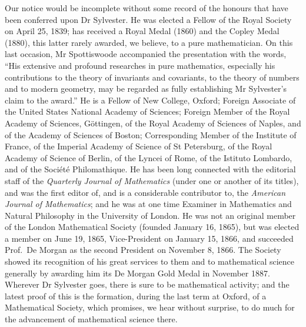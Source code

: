 \documentclass[11pt,a4paper]{article}
\begin{document}
Our notice would be incomplete without some record of the honours that have been conferred upon Dr Sylvester. He was elected a Fellow of the Royal Society on April 25, 1839; has received a Royal Medal (1860) and the Copley Medal (1880), this latter rarely awarded, we believe, to a pure mathematician. On this last occasion, Mr Spottiswoode accompanied the presentation with the words, ``His extensive and profound researches in pure mathematics, especially his contributions to the theory of invariants and covariants, to the theory of numbers and to modern geometry, may be regarded as fully establishing Mr Sylvester's claim to the award.'' He is a Fellow of New College, Oxford; Foreign Associate of the United States National Academy of Sciences; Foreign Member of the Royal Academy of Sciences, G\"ottingen, of the Royal Academy of Sciences of Naples, and of the Academy of Sciences of Boston; Corresponding Member of the Institute of France, of the Imperial Academy of Science of St Petersburg, of the Royal Academy of Science of Berlin, of the Lyncei of Rome, of the Istituto Lombardo, and of the Soci\'et\'e Philomathique. He has been long connected with the editorial staff of the \emph{Quarterly Journal of Mathematics} (under one or another of its titles), and was the first editor of, and is a considerable contributor to, the \emph{American Journal of Mathematics}; and he was at one time Examiner in Mathematics and Natural Philosophy in the University of London. He was not an original member of the London Mathematical Society (founded January 16, 1865), but was elected a member on June 19, 1865, Vice-President on January 15, 1866, and succeeded Prof.\ De Morgan as the second President on November 8, 1866. The Society showed its recognition of his great services to them and to mathematical science generally by awarding him its De Morgan Gold Medal in November 1887. Wherever Dr Sylvester goes, there is sure to be mathematical activity; and the latest proof of this is the formation, during the last term at Oxford, of a Mathematical Society, which promises, we hear without surprise, to do much for the advancement of mathematical science there.

\bigskip
\end{document}

